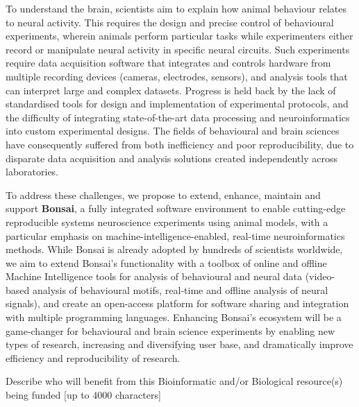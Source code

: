 To understand the brain, scientists aim to explain how animal behaviour relates to neural activity. This requires the design and precise control of behavioural experiments, wherein animals perform particular tasks while experimenters either record or manipulate neural activity in specific neural circuits. Such experiments require data acquisition software that integrates and controls hardware from multiple recording devices (cameras, electrodes, sensors), and analysis tools that can interpret large and complex datasets. Progress is held back by the lack of standardised tools for design and implementation of experimental protocols, and the difficulty of integrating state-of-the-art data processing and neuroinformatics into custom experimental designs. The fields of behavioural and brain sciences have consequently suffered from both inefficiency and poor reproducibility, due to disparate data acquisition and analysis solutions created independently across laboratories.   

To address these challenges, we propose to extend, enhance, maintain and support \textbf{Bonsai}, a fully integrated software environment to enable cutting-edge reproducible systems neuroscience experiments using animal models, with a particular emphasis on machine-intelligence-enabled, real-time neuroinformatics methods. While Bonsai is already adopted by hundreds of scientists worldwide, we aim to extend Bonsai’s functionality with a toolbox of online and offline Machine Intelligence tools for analysis of behavioural and neural data (video-based analysis of behavioural motifs, real-time and offline analysis of neural signals), and create an open-access platform for software sharing and integration with multiple programming languages. Enhancing Bonsai's ecosystem will be a game-changer for behavioural and brain science experiments by enabling new types of research, increasing and diversifying user base, and dramatically improve efficiency and reproducibility of research.


Describe who will benefit from this Bioinformatic and/or Biological resource(s) being funded [up to 4000 characters]

